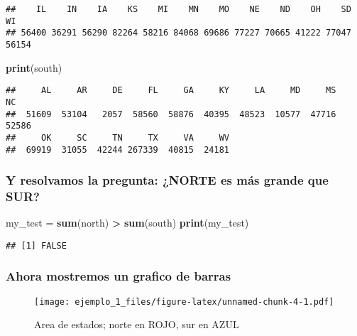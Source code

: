 \documentclass[]{article}
\newenvironment{Shaded}{\begin{snugshade}}{\end{snugshade}}
\newcommand{\KeywordTok}[1]{\textcolor[rgb]{0.13,0.29,0.53}{\textbf{#1}}}
\newcommand{\StringTok}[1]{\textcolor[rgb]{0.31,0.60,0.02}{#1}}
\newcommand{\OperatorTok}[1]{\textcolor[rgb]{0.81,0.36,0.00}{\textbf{#1}}}
\newcommand{\NormalTok}[1]{#1}
\begin{document}
\begin{verbatim}
##    IL    IN    IA    KS    MI    MN    MO    NE    ND    OH    SD    WI 
## 56400 36291 56290 82264 58216 84068 69686 77227 70665 41222 77047 56154
\end{verbatim}

\begin{Shaded}
\begin{Highlighting}[]
\KeywordTok{print}\NormalTok{(south)}
\end{Highlighting}
\end{Shaded}

\begin{verbatim}
##     AL     AR     DE     FL     GA     KY     LA     MD     MS     NC 
##  51609  53104   2057  58560  58876  40395  48523  10577  47716  52586 
##     OK     SC     TN     TX     VA     WV 
##  69919  31055  42244 267339  40815  24181
\end{verbatim}

\subsubsection{Y resolvamos la pregunta: ¿NORTE es más grande que
SUR?}\label{y-resolvamos-la-pregunta-norte-es-mas-grande-que-sur}

\begin{Shaded}
\begin{Highlighting}[]
\NormalTok{my_test =}\StringTok{ }\KeywordTok{sum}\NormalTok{(north) }\OperatorTok{>}\StringTok{ }\KeywordTok{sum}\NormalTok{(south)}
\KeywordTok{print}\NormalTok{(my_test)}
\end{Highlighting}
\end{Shaded}

\begin{verbatim}
## [1] FALSE
\end{verbatim}

\subsubsection{Ahora mostremos un grafico de
barras}\label{ahora-mostremos-un-grafico-de-barras}

\begin{figure}
\centering
\texttt{[image: ejemplo\_1\_files/figure-latex/unnamed-chunk-4-1.pdf]}
\caption{Area de estados; norte en ROJO, sur en AZUL}
\end{figure}
\end{document}
